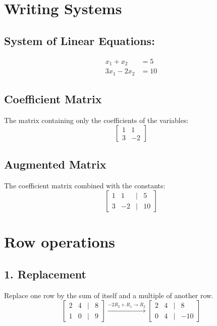 \documentclass{article}
\begin{document}
\section*{Writing Systems}
\vspace{1em}

\subsection*{System of Linear Equations:}
\begin{align*}
x_1 + x_2 &= 5 \\
3x_1 - 2x_2 &= 10
\end{align*}
\vspace{2em}

\subsection*{Coefficient Matrix}
The matrix containing only the coefficients of the variables:
\vspace{0.5em}
\[
\begin{bmatrix}
1 & 1 \\
3 & -2
\end{bmatrix}
\]
\vspace{2em}

\subsection*{Augmented Matrix}
The coefficient matrix combined with the constants:
\vspace{0.5em}
\[
\begin{bmatrix}
1 & 1 & | & 5 \\
3 & -2 & | & 10
\end{bmatrix}
\]
\vspace{2em}

\section*{Row operations}
\vspace{1em}

\subsection*{1. Replacement}
Replace one row by the sum of itself and a multiple of another row.
\vspace{0.5em}
\[
\begin{bmatrix}
2 & 4 & | & 8 \\
1 & 0 & | & 9
\end{bmatrix}
\xrightarrow{-2R_2 + R_1 \rightarrow R_2}
\begin{bmatrix}
2 & 4 & | & 8 \\
0 & 4 & | & -10
\end{bmatrix}
\]
\vspace{2em}
\end{document}
